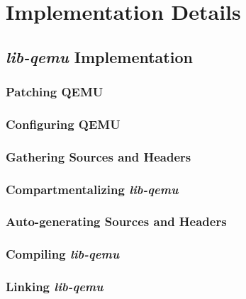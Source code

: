 \chapter{Implementation Details}
\label{chapter:implementation-details}



\section{\textit{lib-qemu} Implementation}
\label{sec:lib-qemu-impl}

\subsection{Patching QEMU}
\label{subsec:patching-qemu}

\subsection{Configuring QEMU}
\label{subsec:configuring-qemu}

\subsection{Gathering Sources and Headers}
\label{subsec:gathering-sources-headers}

\subsection{Compartmentalizing \textit{lib-qemu}}
\label{subsec:compartmentalizing-qemu}

\subsection{Auto-generating Sources and Headers}
\label{subsec:autogenerating-sources-headers}

\subsection{Compiling \textit{lib-qemu}}
\label{subsec:compiling-qemu}

\subsection{Linking \textit{lib-qemu}}
\label{subsec:linking-qemu}

